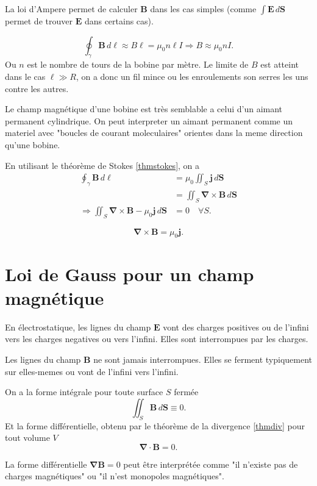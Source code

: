 La loi d'Ampere permet de calculer $\boldsymbol{B}$ dans les cas simples (comme $\int \boldsymbol{E}\,d\boldsymbol{S}$ permet de trouver $\boldsymbol{E}$ dans certains cas).

\begin{example}
$$
\oint _{\gamma}\boldsymbol{B}\,d\boldsymbol{\ell}\approx B\ell=\mu_{0}n\ell I\Rightarrow B\approx\mu_{0}nI.
$$
Ou $n$ est le nombre de tours de la bobine par mètre. Le limite de $B$ est atteint dans le cas $\ell\gg R$, on a donc un fil mince ou les enroulements son serres les uns contre les autres.
\end{example}
\begin{remark}
Le champ magnétique d'une bobine est très semblable a celui d'un aimant permanent cylindrique. On peut interpreter un aimant permanent comme un materiel avec "boucles de courant moleculaires" orientes dans la meme direction qu'une bobine.
\end{remark}

En utilisant le théorème de Stokes \ref{thmstokes}, on a 
\begin{align*}
\oint _{\gamma}\boldsymbol{B}\,d\boldsymbol{\ell} & =\mu_{0} \iint _{S}\boldsymbol{j}\,d\boldsymbol{S} \\
 & =\iint _{S}\boldsymbol{\nabla}\times \boldsymbol{B}\,d\boldsymbol{S} \\
 \Rightarrow \iint _{S}\boldsymbol{\nabla}\times \boldsymbol{B}-\mu_{0}\boldsymbol{j}\,d\boldsymbol{S} & =0\quad \forall S.
\end{align*}
\begin{theorem}
$$
\boldsymbol{\nabla}\times \boldsymbol{B}=\mu_{0}\boldsymbol{j}.
$$
\end{theorem}
\section{Loi de Gauss pour un champ magnétique}
\begin{reminder}
En électrostatique, les lignes du champ $\boldsymbol{E}$ vont des charges positives ou de l'infini vers les charges negatives ou vers l'infini. Elles sont interrompues par les charges.
\end{reminder}

Les lignes du champ $\boldsymbol{B}$ ne sont jamais interrompues. Elles se ferment typiquement sur elles-memes ou vont de l'infini vers l'infini.

\begin{theorem}
On a la forme intégrale pour toute surface $S$ fermée
$$
\iint _{S}\boldsymbol{B}\,d\boldsymbol{S}\equiv0.
$$
Et la forme différentielle, obtenu par le théorème de la divergence \ref{thmdiv} pour tout volume $V$
$$
\boldsymbol{\nabla}\cdot \boldsymbol{B}=0.
$$
\end{theorem}
\begin{remark}
La forme différentielle $\boldsymbol{\nabla B}=0$ peut être interprétée comme "il n'existe pas de charges magnétiques" ou "il n'est monopoles magnétiques".
\end{remark}
